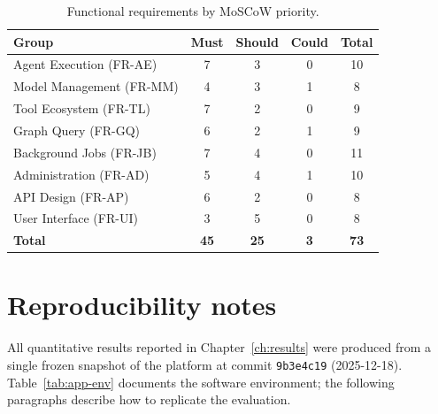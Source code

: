 \documentclass[a4paper,noexaminfo]{sapthesis}
\begin{document}
\begin{table}[ht]
\centering
\caption{Functional requirements by MoSCoW priority.}
\label{tab:app-fr-moscow}
\small
\begin{tabularx}{\textwidth}{@{}l c c c c@{}}
    \hline
    \textbf{Group} & \textbf{Must} & \textbf{Should} & \textbf{Could}
        & \textbf{Total} \\
    \hline
    Agent Execution (FR-AE)      & 7  & 3 & 0 & 10 \\
    Model Management (FR-MM)     & 4  & 3 & 1 &  8 \\
    Tool Ecosystem (FR-TL)       & 7  & 2 & 0 &  9 \\
    Graph Query (FR-GQ)          & 6  & 2 & 1 &  9 \\
    Background Jobs (FR-JB)      & 7  & 4 & 0 & 11 \\
    Administration (FR-AD)       & 5  & 4 & 1 & 10 \\
    API Design (FR-AP)           & 6  & 2 & 0 &  8 \\
    User Interface (FR-UI)       & 3  & 5 & 0 &  8 \\
    \hline
    \textbf{Total}               & \textbf{45} & \textbf{25} &
        \textbf{3} & \textbf{73} \\
    \hline
\end{tabularx}
\end{table}


\section{Reproducibility notes}
\label{app:reproducibility}

All quantitative results reported in Chapter~\ref{ch:results} were
produced from a single frozen snapshot of the platform at commit
\texttt{9b3e4c19} (2025-12-18).  Table~\ref{tab:app-env} documents the
software environment; the following paragraphs describe how to
replicate the evaluation.
\end{document}
